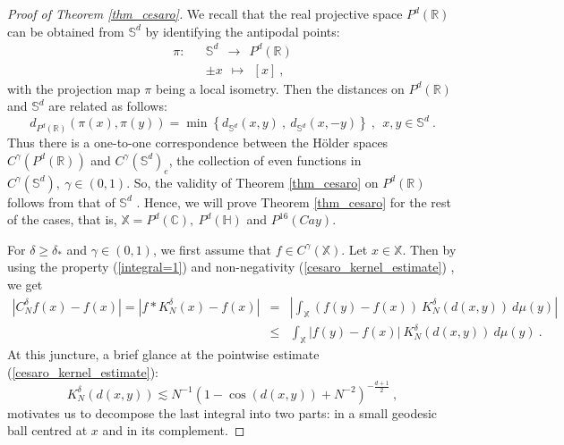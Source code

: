 \documentclass[12pt]{amsart}
\theoremstyle{definition}
\newcommand{\R}{\mathbb R}%
\newcommand{\C}{\mathbb C}%
\newcommand{\Sb}{\mathbb S}%
\newcommand{\X}{\mathbb X}%
\newcommand{\Hb}{\mathbb H}%
\numberwithin{equation}{section}
\begin{document}
\begin{proof}[Proof of Theorem \ref{thm_cesaro}]
We recall that the real projective space $P^d(\R)$ can be obtained from $\Sb^d$ by identifying the antipodal points:
\begin{eqnarray*}
\pi : &&\Sb^d\:\: \to \:\: P^d(\R) \\
&& \pm x \:\:\mapsto \:\: [x]\:,
\end{eqnarray*}
with the projection map $\pi$ being a local isometry. Then the distances on $P^d(\R)$ and $\Sb^d$ are related as follows:
\begin{equation*}
d_{P^d(\R)}\left(\pi(x),\pi(y)\right)= \min \left\{d_{\Sb^d}(x,y)\:,\:d_{\Sb^d}(x,-y)\right\}\:,\:\:x,y \in \Sb^d\:.
\end{equation*}
Thus there is a one-to-one correspondence between the H\"older spaces $C^\gamma\left(P^d(\R)\right)$  and $C^\gamma\left(\Sb^d\right)_e$, the collection of even functions in $C^\gamma\left(\Sb^d\right),\:\gamma \in (0,1)$. So, the validity of Theorem \ref{thm_cesaro} on $P^d(\R)$ follows from that of $\Sb^d$ \cite[Theorem 2.13]{Huynh}. Hence, we will prove Theorem \ref{thm_cesaro} for the rest of the cases, that is, $\X=P^d(\C),\:P^d(\Hb)$ and $P^{16}(Cay)$.

For $\delta \ge \delta_*$ and $\gamma \in (0,1)$, we first assume that $f \in C^\gamma(\X)$. Let $x \in \X$. Then by using the property (\ref{integral=1}) and non-negativity (\ref{cesaro_kernel_estimate}) , we get
\begin{eqnarray} \label{cesaro_pf_eq1}
\left|C^\delta_Nf(x)-f(x)\right| = \left|f*K^\delta_N(x) - f(x)\right| &=& \left|\int_{\X} \left(f(y)-f(x)\right)\:
K^\delta_N(d(x,y))\:d\mu(y)\right|\nonumber\\
&\le & \int_{\X}  |f(y)-f(x)|\:K^\delta_N(d(x,y))\:d\mu(y)\:.
\end{eqnarray}
At this juncture, a brief glance at the pointwise estimate (\ref{cesaro_kernel_estimate}):
\begin{equation*} 
 K^\delta_N(d(x,y)) \lesssim N^{-1}\left(1-\cos(d(x,y)) +N^{-2}\right)^{-\frac{d+1}{2}}\:, 
\end{equation*}
motivates us to decompose the last integral into two parts: in a small geodesic ball centred at $x$ and in its complement.


\end{proof}
\end{document}
